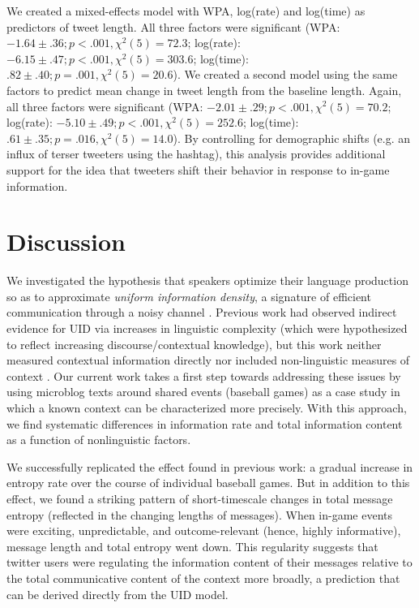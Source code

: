 \documentclass[11pt,letterpaper]{article}
\begin{document}
We created a mixed-effects model with WPA, log(rate) and log(time) as predictors of tweet length.  All three factors were significant (WPA: $-1.64 \pm .36; p<.001, \chi^2(5)=72.3$; log(rate): $-6.15 \pm .47; p<.001, \chi^2(5) =303.6 $; log(time): $.82 \pm .40; p=.001, \chi^2(5)=20.6$).  We created a second model using the same factors to predict mean change in tweet length from the baseline length. Again, all three factors were significant (WPA: $-2.01 \pm .29; p<.001, \chi^2(5)=70.2$; log(rate): $-5.10 \pm .49; p<.001, \chi^2(5) = 252.6$; log(time): $.61 \pm .35; p=.016, \chi^2(5)=14.0$).  By controlling for demographic shifts (e.g. an influx of terser tweeters using the hashtag), this analysis provides additional support for the idea that tweeters shift their behavior in response to in-game information.

\section{Discussion}

We investigated the hypothesis that speakers optimize their language production so as to approximate \emph{uniform information density}, a signature of efficient communication through a noisy channel \cite{shannon1948,levy2007}. Previous work had observed indirect evidence for UID via increases in linguistic complexity (which were hypothesized to reflect increasing discourse/contextual knowledge), but this work neither measured contextual information directly nor included non-linguistic measures of context \cite{genzel2002,genzel2003,qian2012}. Our current work takes a first step towards addressing these issues by using microblog texts around shared events (baseball games) as a case study in which a known context can be characterized more precisely. With this approach, we find systematic differences in information rate and total information content as a function of nonlinguistic factors. 

We successfully replicated the effect found in previous work: a gradual increase in entropy rate over the course of individual baseball games. But in addition to this effect, we found a striking pattern of short-timescale changes in total message entropy (reflected in the changing lengths of messages). When in-game events were exciting, unpredictable, and outcome-relevant (hence, highly informative), message length and total entropy went down. This regularity suggests that twitter users were regulating the information content of their messages relative to the total communicative content of the context more broadly, a prediction that can be derived directly from the UID model. 
\end{document}
